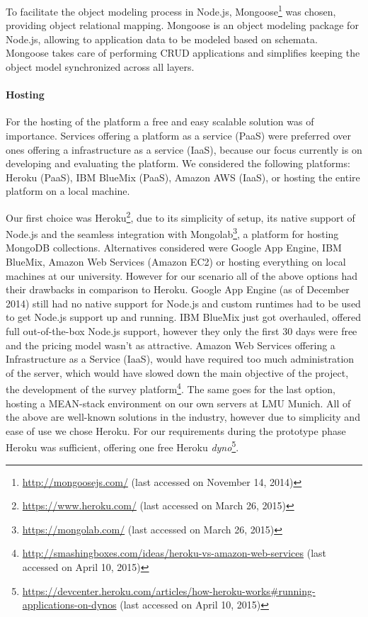 		To facilitate the object modeling process in Node.js, Mongoose\footnote{\url{http://mongoosejs.com/} (last accessed on November 14, 2014)} was chosen, providing object relational mapping. Mongoose is an object modeling package for Node.js, allowing to application data to be modeled based on schemata. Mongoose takes care of performing CRUD applications and simplifies keeping the object model synchronized across all layers.


	\paragraph{Hosting}

		For the hosting of the platform a free and easy scalable solution was of importance. Services offering a platform as a service (PaaS) were preferred over ones offering a infrastructure as a service (IaaS), because our focus currently is on developing and evaluating the platform. We considered the following platforms: Heroku (PaaS), IBM BlueMix (PaaS), Amazon AWS (IaaS), or hosting the entire platform on a local machine.

		Our first choice was Heroku\footnote{\url{https://www.heroku.com/} (last accessed on March 26, 2015)}, due to its simplicity of setup, its native support of Node.js and the seamless integration with Mongolab\footnote{\url{https://mongolab.com/} (last accessed on March 26, 2015)}, a platform for hosting MongoDB collections.
		Alternatives considered were Google App Engine, IBM BlueMix, Amazon Web Services (Amazon EC2) or hosting everything on local machines at our university. However for our scenario all of the above options had their drawbacks in comparison to Heroku. Google App Engine (as of December 2014) still had no native support for Node.js and custom runtimes had to be used to get Node.js support up and running. IBM BlueMix just got overhauled, offered full out-of-the-box Node.js support, however they only the first 30 days were free and the pricing model wasn't as attractive. Amazon Web Services offering a Infrastructure as a Service (IaaS), would have required too much administration of the server, which would have slowed down the main objective of the project, the development of the survey platform\footnote{\url{http://smashingboxes.com/ideas/heroku-vs-amazon-web-services} (last accessed on April 10, 2015)}. The same goes for the last option, hosting a MEAN-stack environment on our own servers at LMU Munich. All of the above are well-known solutions in the industry, however due to simplicity and ease of use we chose Heroku. For our requirements during the prototype phase Heroku was sufficient, offering one free Heroku \textit{dyno}\footnote{\url{https://devcenter.heroku.com/articles/how-heroku-works\#running-applications-on-dynos} (last accessed on April 10, 2015)}.




